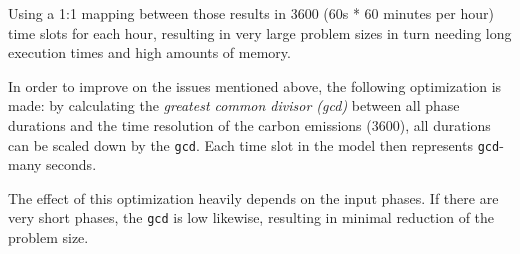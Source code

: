 Using a 1:1 mapping between those results in 3600 (60s * 60 minutes per hour) time slots for each hour, resulting in very large problem sizes in turn needing long execution times and high amounts of memory.

In order to improve on the issues mentioned above, the following optimization is made: by calculating the \emph{greatest common divisor (gcd)} between all phase durations and the time resolution of the carbon emissions (3600), all durations can be scaled down by the \verb|gcd|. Each time slot in the model then represents \verb|gcd|-many seconds.

The effect of this optimization heavily depends on the input phases. 
If there are very short phases, the \verb|gcd| is low likewise, resulting in minimal reduction of the problem size.
